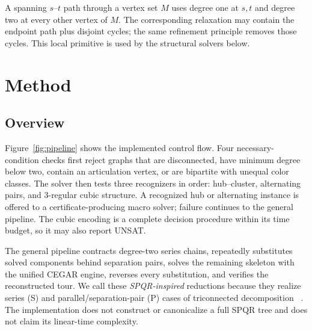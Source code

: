 \documentclass[sigconf,anonymous]{aamas}
\begin{document}
A spanning $s$--$t$ path through a vertex set $M$ uses degree one at
$s,t$ and degree two at every other vertex of $M$. The corresponding
relaxation may contain the endpoint path plus disjoint cycles; the
same refinement principle removes those cycles. This local primitive
is used by the structural solvers below.

\section{Method}
\label{sec:method}

\subsection{Overview}
\label{sec:overview}

Figure~\ref{fig:pipeline} shows the implemented control flow. Four
necessary-condition checks first reject graphs that are disconnected,
have minimum degree below two, contain an articulation vertex, or are
bipartite with unequal color classes. The solver then tests three
recognizers in order: hub--cluster, alternating pairs, and 3-regular
cubic structure. A recognized hub or alternating instance is offered to
a certificate-producing macro solver; failure continues to the general
pipeline. The cubic encoding is a complete decision procedure within
its time budget, so it may also report UNSAT.

The general pipeline contracts degree-two series chains, repeatedly
substitutes solved components behind separation pairs, solves the
remaining skeleton with the unified CEGAR engine, reverses every
substitution, and verifies the reconstructed tour. We call these
\emph{SPQR-inspired} reductions because they realize series (S) and
parallel/separation-pair (P) cases of triconnected decomposition
~\cite{hopcroft1973triconnected,dibattista1996spqr}. The implementation does not construct
or canonicalize a full SPQR tree and does not claim its linear-time
complexity.
\end{document}
